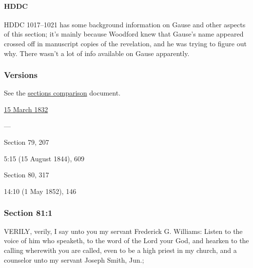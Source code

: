 		\paragraph{HDDC}
		
			HDDC 1017--1021 has some background information on Gause and other aspects of this section; it's mainly because Woodford knew that Gause's name appeared crossed off in manuscript copies of the revelation, and he was trying to figure out why. There wasn't a lot of info available on Gause apparently.
		
	\subsubsection{Versions}
		\label{DC81-V}
		
		See the \href{https://drive.google.com/file/d/1goAvNz8jS4R8slYfMG_db55Ty2z_vmgK/view?usp=sharing}{sections comparison} document.
	
		\begin{compactdesc}
			\item[JSP] \hyperref[EMS-1832-JS-15-MAR-1832]{15 March 1832}
			\item[BC] ---
			\item[DC 1835] Section 79, 207
			\item[TS] 5:15 (15 August 1844), 609
			\item[DC 1844] Section 80, 317
			\item[MS] 14:10 (1 May 1852), 146
		\end{compactdesc}

	\subsubsection{Section 81:1} %
		\label{DC81-1}

		VERILY, verily, I say unto you my servant Frederick G. Williams: Listen to the voice of him who speaketh, to the word of the Lord your God, and hearken to the calling wherewith you are called, even to be a high priest in my church, and a counselor unto my servant Joseph Smith, Jun.;


